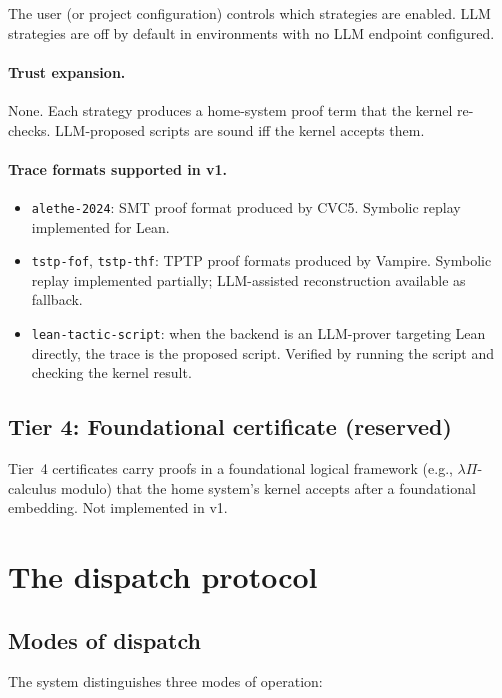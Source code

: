 \documentclass[11pt,letterpaper]{article}
\theoremstyle{definition}
\theoremstyle{remark}
\begin{document}
The user (or project configuration) controls which strategies are
enabled. LLM strategies are off by default in environments with no LLM
endpoint configured.

\paragraph{Trust expansion.} None. Each strategy produces a
home-system proof term that the kernel re-checks. LLM-proposed scripts
are sound iff the kernel accepts them.

\paragraph{Trace formats supported in v1.}

\begin{itemize}[leftmargin=2em]
  \item \texttt{alethe-2024}: SMT proof format produced by CVC5.
        Symbolic replay implemented for Lean.
  \item \texttt{tstp-fof}, \texttt{tstp-thf}: TPTP proof formats produced
        by Vampire. Symbolic replay implemented partially; LLM-assisted
        reconstruction available as fallback.
  \item \texttt{lean-tactic-script}: when the backend is an LLM-prover
        targeting Lean directly, the trace is the proposed script.
        Verified by running the script and checking the kernel result.
\end{itemize}

\subsection{Tier 4: Foundational certificate (reserved)}

Tier~4 certificates carry proofs in a foundational logical framework
(e.g., $\lambda\Pi$-calculus modulo) that the home system's kernel
accepts after a foundational embedding. Not implemented in v1.

\section{The dispatch protocol}
\label{sec:dispatch}

\subsection{Modes of dispatch}

The system distinguishes three modes of operation:
\end{document}
